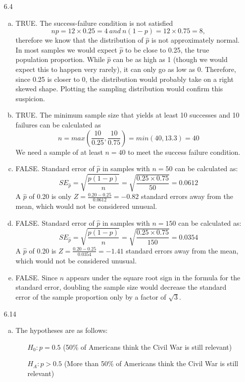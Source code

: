 \documentclass[11pt]{article}
\begin{document}
\begin{enumerate}
\item[6.4]
\begin{enumerate}[(a)]
\item TRUE. The success-failure condition is not satisfied
\[ np = 12 \times  0.25 = 4~and~ n(1-p) = 12 \times  0.75 = 8, \]
therefore we know that the distribution of $\hat{p}$ is not approximately normal. In most samples we would expect $\hat{p}$ to be close to 0.25, the true population proportion. While $\hat{p}$ can be as high as 1 (though we would expect this to happen very rarely), it can only go as low as 0. Therefore, since 0.25 is closer to 0, the distribution would probably take on a right skewed shape. Plotting the sampling distribution would confirm this suspicion.
\item TRUE. The minimum sample size that yields at least 10 successes and 10 failures can be calculated as
\[ n = max \left( \frac{10}{0.25}, \frac{10}{0.75} \right) = min(40, 13.3) = 40 \]
We need a sample of at least $n = 40$ to meet the success failure condition.
\item FALSE. Standard error of $\hat{p}$ in samples with $n = 50$ can be calculated as:
\[SE_{\hat{p}} = \sqrt{ \frac{p(1-p)}{n} } = \sqrt{\frac{0.25 \times  0.75}{50}} = 0.0612 \]
A $\hat{p}$ of 0.20 is only $Z = \frac{0.20 - 0.25}{0.0612} = -0.82$ standard errors away from the mean, which would not be considered unusual.
\item FALSE. Standard error of $\hat{p}$ in samples with $n = 150$ can be calculated as:
\[SE_{\hat{p}} = \sqrt{ \frac{p(1-p)}{n} } = \sqrt{\frac{0.25 \times  0.75}{150}} = 0.0354 \]
A $\hat{p}$ of 0.20 is $Z = \frac{0.20 - 0.25}{0.0354} = -1.41$ standard errors away from the mean, which would not be considered unusual.
\item FALSE.  Since $n$ appears under the square root sign in the formula for the standard error, doubling the sample size would decrease the standard error of the sample proportion only by a factor of $\sqrt{3}$.
\end{enumerate}

%

\item[6.14]
\begin{enumerate}[(a)]
\item The hypotheses are as follows:
\begin{itemize}
\item[] $H_0: p = 0.5$ (50\% of Americans think the Civil War is still relevant)
\item[] $H_A: p > 0.5$ (More than 50\% of Americans think the Civil War is still relevant)
\end{itemize}


\end{enumerate}
\end{enumerate}
\end{document}
